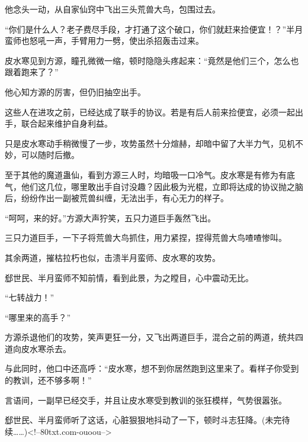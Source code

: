 \begin{this_body}
他念头一动，从自家仙窍中飞出三头荒兽大鸟，包围过去。

“你们是什么人？老子费尽手段，才打通了这个破口，你们就赶来捡便宜！？”半月蛮师也怒吼一声，手臂用力一劈，使出杀招轰击过来。

皮水寒见到方源，瞳孔微微一缩，顿时隐隐头疼起来：“竟然是他们三个，怎么也跟着跑来了？”

他心知方源的厉害，但仍旧抽空出手。

这些人在进攻之前，已经达成了联手的协议。若是有后人前来捡便宜，必须一起出手，联合起来维护自身利益。

只是皮水寒动手稍微慢了一步，攻势虽然十分煊赫，却暗中留了大半力气，见机不妙，可以随时后撤。

至于其他的魔道蛊仙，看到方源三人时，均暗吸一口冷气。皮水寒是有修为有底气，他们这几位，哪里敢出手自讨没趣？因此极为光棍，立即将达成的协议抛之脑后，纷纷作出一副被荒兽纠缠，无法出手，有心无力的样子。

“呵呵，来的好。”方源大声狞笑，五只力道巨手轰然飞出。

三只力道巨手，一下子将荒兽大鸟抓住，用力紧捏，捏得荒兽大鸟喳喳惨叫。

其余两道，摧枯拉朽也似，击溃半月蛮师、皮水寒的攻势。

郄世民、半月蛮师不知前情，看到此景，为之瞠目，心中震动无比。

“七转战力！”

“哪里来的高手？”

方源杀退他们的攻势，笑声更狂一分，又飞出两道巨手，混合之前的两道，统共四道向皮水寒杀去。

与此同时，他口中还高呼：“皮水寒，想不到你居然跑到这里来了。看样子你受到的教训，还不够多啊！”

言语间，一副早已经交手，并且让皮水寒受到教训的张狂模样，气势很嚣张。

郄世民、半月蛮师听了这话，心脏狠狠地抖动了一下，顿时斗志狂降。(未完待续……)<!--80txt.com-ouoou-->

\end{this_body}

